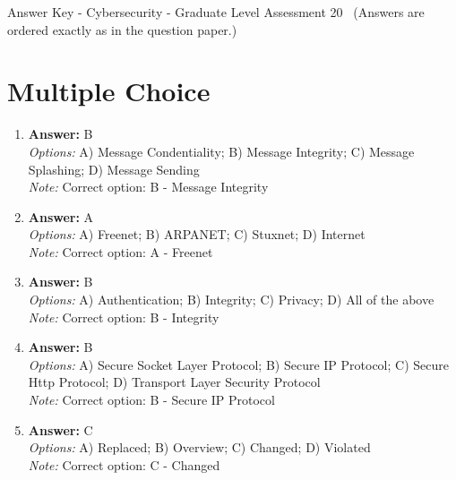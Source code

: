 \documentclass[12pt]{article}
\begin{document}
\begin{center}
Answer Key - Cybersecurity - Graduate Level Assessment 20 \
\small (Answers are ordered exactly as in the question paper.)
\end{center}

\section*{Multiple Choice}
\begin{enumerate}[label=\arabic*.]
\item \textbf{Answer:} B
\\ \textit{Options:} A) Message Condentiality; B) Message Integrity; C) Message Splashing; D) Message Sending
\\ \textit{Note:} Correct option: B - Message Integrity
\item \textbf{Answer:} A
\\ \textit{Options:} A) Freenet; B) ARPANET; C) Stuxnet; D) Internet
\\ \textit{Note:} Correct option: A - Freenet
\item \textbf{Answer:} B
\\ \textit{Options:} A) Authentication; B) Integrity; C) Privacy; D) All of the above
\\ \textit{Note:} Correct option: B - Integrity
\item \textbf{Answer:} B
\\ \textit{Options:} A) Secure Socket Layer Protocol; B) Secure IP Protocol; C) Secure Http Protocol; D) Transport Layer Security Protocol
\\ \textit{Note:} Correct option: B - Secure IP Protocol
\item \textbf{Answer:} C
\\ \textit{Options:} A) Replaced; B) Overview; C) Changed; D) Violated
\\ \textit{Note:} Correct option: C - Changed
\end{enumerate}
\end{document}
